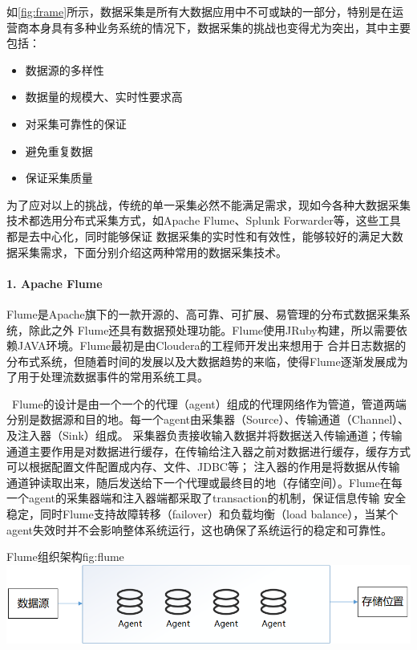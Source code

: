 \documentclass{HustGraduPaper}
\begin{document}
    如\autoref{fig:frame}所示，数据采集是所有大数据应用中不可或缺的一部分，特别是在运营商本身具有多种业务系统的情况下，数据采集的挑战也变得尤为突出，其中主要包括：
    \begin{itemize}
		\item 数据源的多样性
        \item 数据量的规模大、实时性要求高
        \item 对采集可靠性的保证
        \item 避免重复数据
        \item 保证采集质量
    \end{itemize}
    为了应对以上的挑战，传统的单一采集必然不能满足需求，现如今各种大数据采集技术都选用分布式采集方式，如Apache Flume、Splunk Forwarder等，这些工具都是去中心化，同时能够保证
    数据采集的实时性和有效性，能够较好的满足大数据采集需求，下面分别介绍这两种常用的数据采集技术。
    \bigskip
    \paragraph{1. Apache Flume\\}

    Flume是Apache旗下的一款开源的、高可靠、可扩展、易管理的分布式数据采集系统，除此之外 Flume还具有数据预处理功能。Flume使用JRuby构建，所以需要依赖JAVA环境。Flume最初是由Cloudera的工程师开发出来想用于
    合并日志数据的分布式系统，但随着时间的发展以及大数据趋势的来临，使得Flume逐渐发展成为了用于处理流数据事件的常用系统工具。%

    \ Flume的设计是由一个一个的代理（agent）组成的代理网络作为管道，管道两端分别是数据源和目的地。每一个agent由采集器（Source）、传输通道（Channel）、及注入器（Sink）组成。
    采集器负责接收输入数据并将数据送入传输通道；传输通道主要作用是对数据进行缓存，在传输给注入器之前对数据进行缓存，缓存方式可以根据配置文件配置成内存、文件、JDBC等；
    注入器的作用是将数据从传输通道钟读取出来，随后发送给下一个代理或最终目的地（存储空间）。Flume在每一个agent的采集器端和注入器端都采取了transaction的机制，保证信息传输
    安全稳定，同时Flume支持故障转移（failover）和负载均衡（load balance），当某个agent失效时并不会影响整体系统运行，这也确保了系统运行的稳定和可靠性。
     
    \begin{generalfig}[htb]{Flume组织架构}{fig:flume}
        \includegraphics[width=\textwidth]{Figures/flume.png}
    \end{generalfig}
\end{document}
